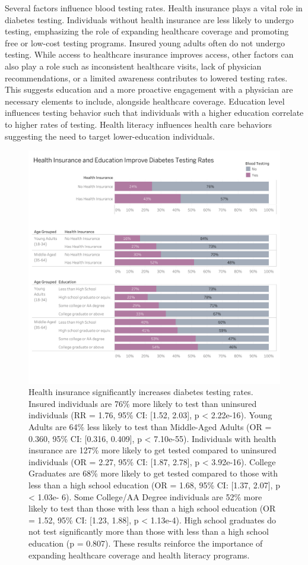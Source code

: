 \documentclass[
]{article}
\begin{document}
Several factors influence blood testing rates. Health insurance plays a
vital role in diabetes testing. Individuals without health insurance are
less likely to undergo testing, emphasizing the role of expanding
healthcare coverage and promoting free or low-cost testing programs.
Insured young adults often do not undergo testing. While access to
healthcare insurance improves access, other factors can also play a role
such as inconsistent healthcare visits, lack of physician
recommendations, or a limited awareness contributes to lowered testing
rates. This suggests education and a more proactive engagement with a
physician are necessary elements to include, alongside healthcare
coverage. Education level influences testing behavior such that
individuals with a higher education correlate to higher rates of
testing. Health literacy influences health care behaviors suggesting the
need to target lower-education individuals.

\begin{figure}[H]

{\centering \includegraphics[width=0.8\linewidth]{../figures/Health Insurance and Education in Blood Testing} 

}

\caption{Health insurance significantly increases diabetes testing rates. Insured individuals are 76\% more likely to test than uninsured individuals (RR = 1.76, 95\% CI: [1.52, 2.03], p < 2.22e-16). Young Adults are 64\% less likely to test than Middle-Aged Adults (OR = 0.360, 95\% CI: [0.316, 0.409], p < 7.10e-55). Individuals with health insurance are 127\% more likely to get tested compared to uninsured individuals (OR = 2.27, 95\% CI: [1.87, 2.78], p < 3.92e-16). College Graduates are 68\% more likely to get tested compared to those with less than a high school education (OR = 1.68, 95\% CI: [1.37, 2.07], p < 1.03e- 6). Some College/AA Degree individuals are 52\% more likely to test than those with less than a high school education (OR = 1.52, 95\% CI: [1.23, 1.88], p < 1.13e-4). High school graduates do not test significantly more than those with less than a high school education (p = 0.807). These results reinforce the importance of expanding healthcare coverage and health literacy programs.}\label{fig:fig_testing_by_insurance_education}
\end{figure}
\end{document}
